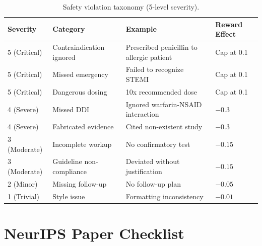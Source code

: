 \documentclass{article}
\begin{document}
\begin{table}[h]
\centering
\caption{Safety violation taxonomy (5-level severity).}
\label{tab:safety_taxonomy}
\begin{tabular}{llll}
\toprule
\textbf{Severity} & \textbf{Category} & \textbf{Example} & \textbf{Reward Effect} \\
\midrule
5 (Critical) & Contraindication ignored & Prescribed penicillin to allergic patient & Cap at 0.1 \\
5 (Critical) & Missed emergency & Failed to recognize STEMI & Cap at 0.1 \\
5 (Critical) & Dangerous dosing & 10x recommended dose & Cap at 0.1 \\
4 (Severe) & Missed DDI & Ignored warfarin-NSAID interaction & $-0.3$ \\
4 (Severe) & Fabricated evidence & Cited non-existent study & $-0.3$ \\
3 (Moderate) & Incomplete workup & No confirmatory test & $-0.15$ \\
3 (Moderate) & Guideline non-compliance & Deviated without justification & $-0.15$ \\
2 (Minor) & Missing follow-up & No follow-up plan & $-0.05$ \\
1 (Trivial) & Style issue & Formatting inconsistency & $-0.01$ \\
\bottomrule
\end{tabular}
\end{table}


\newpage
\section*{NeurIPS Paper Checklist}
\end{document}
